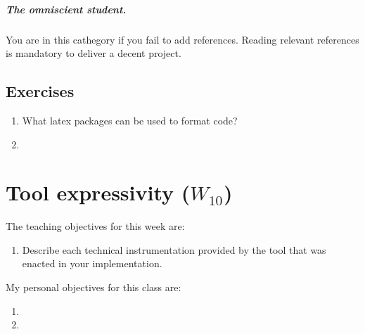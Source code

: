 \documentclass[a4paper,12pt]{report}
\begin{document}
\paragraph{The omniscient student.}
You are in this cathegory if you fail to add references. 
Reading relevant references is mandatory to deliver a decent project. 

\section{Exercises}
\begin{enumerate}
 \item What latex packages can be used to format code? 
 \item 
\end{enumerate}

\vspace{0.5cm}

\vspace{0.5cm}




\chapter{Tool expressivity ($W_{10}$)}


The teaching objectives for this week are:
\begin{enumerate}
 \item Describe each technical instrumentation provided 
by the tool that was enacted in your implementation.
\end{enumerate}

\vspace{0.5cm}

My personal objectives for this class are:
\begin{enumerate}
 \item 
 \item 
\end{enumerate}



\end{document}
